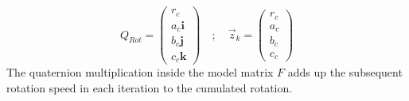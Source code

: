 \begin{equation*}
    Q_{Rot}=\begin{pmatrix}
        r_{c}           \\
        a_{c}\textbf{i} \\
        b_{c}\textbf{j} \\
        c_{c}\textbf{k}
    \end{pmatrix} \quad ; \quad \vec{z}_{k} =\begin{pmatrix}
        r_{c} \\
        a_{c} \\
        b_{c} \\
        c_{c}
    \end{pmatrix}
\end{equation*}
The quaternion multiplication inside the model matrix $F$ adds up the subsequent rotation speed in each iteration to the cumulated rotation.

